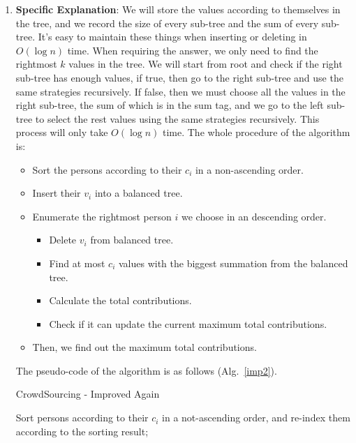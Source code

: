 \documentclass[12pt,a4paper]{article}
\makeatletter
\newtheorem*{solution}{Solution}
\theoremstyle{definition}
\renewenvironment{solution}[1][Solution] {\par\pushQED{\qed}\normalfont\topsep6\p@\@plus6\p@\relax\trivlist\item[\hskip\labelsep\bfseries#1\@addpunct{.}]\ignorespaces}{\popQED\endtrivlist\@endpefalse} \makeatother
\makeatother
\begin{document}
\begin{enumerate}
\begin{solution}
        \textbf{Specific Explanation}: {\color{blue} We will store the values according to themselves in the tree, and we record the size of every sub-tree and the sum of every sub-tree. It's easy to maintain these things when inserting or deleting in $O(\log{n})$ time. When requiring the answer, we only need to find the rightmost $k$ values in the tree. We will start from root and check if the right sub-tree has enough values, if true, then go to the right sub-tree and use the same strategies recursively. If false, then we must choose all the values in the right sub-tree, the sum of which is in the sum tag, and we go to the left sub-tree to select the rest values using the same strategies recursively. This process will only take $O(\log{n})$ time.}
        \clearpage
        The whole procedure of the algorithm is:
        \begin{itemize}
        \item Sort the persons according to their $c_i$ in a non-ascending order.
        \item Insert their $v_i$ into a balanced tree.
        \item Enumerate the rightmost person $i$ we choose in an descending order.
        \begin{itemize}
        \item Delete $v_i$ from balanced tree.
        \item Find at most $c_i$ values with the biggest summation from the balanced tree.
        \item Calculate the total contributions.
        \item Check if it can update the current maximum total contributions.
        \end{itemize}
        \item Then, we find out the maximum total contributions.
        \end{itemize}
        The pseudo-code of the algorithm is as follows (Alg.~\ref{imp2}).


        \begin{minipage}[t]{0.9\textwidth}
        \begin{algorithm}[H]

            \BlankLine
            \caption{CrowdSourcing - Improved Again}
            \label{imp2}
            Sort persons according to their $c_i$ in a not-ascending order, and re-index them according to the sorting result;


\end{algorithm}
\end{minipage}
\end{solution}
\end{enumerate}
\end{document}
